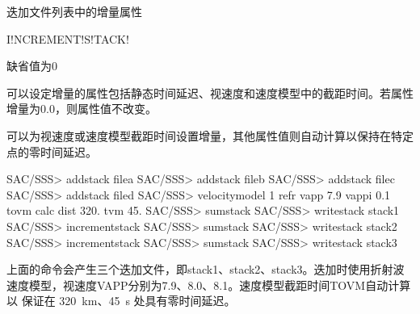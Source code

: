 \label{sss:incrementstack}

迭加文件列表中的增量属性

\begin{SACSTX}
I!NCREMENT!S!TACK!
\end{SACSTX}

缺省值为0

可以设定增量的属性包括静态时间延迟、视速度和速度模型中的截距时间。若属性
增量为0.0，则属性值不改变。

可以为视速度或速度模型截距时间设置增量，其他属性值则自动计算以保持在特定点的零时间延迟。

\begin{SACCode}
SAC/SSS> addstack filea
SAC/SSS> addstack fileb
SAC/SSS> addstack filec
SAC/SSS> addstack filed
SAC/SSS> velocitymodel 1 refr vapp 7.9 vappi 0.1 tovm calc dist 320. tvm 45.
SAC/SSS> sumstack
SAC/SSS> writestack stack1
SAC/SSS> incrementstack
SAC/SSS> sumstack
SAC/SSS> writestack stack2
SAC/SSS> incrementstack
SAC/SSS> sumstack
SAC/SSS> writestack stack3
\end{SACCode}

上面的命令会产生三个迭加文件，即stack1、stack2、stack3。迭加时使用折射波
速度模型，视速度VAPP分别为7.9、8.0、8.1。速度模型截距时间TOVM自动计算以
保证在 \SI{320}{\km}、\SI{45}{\s} 处具有零时间延迟。
